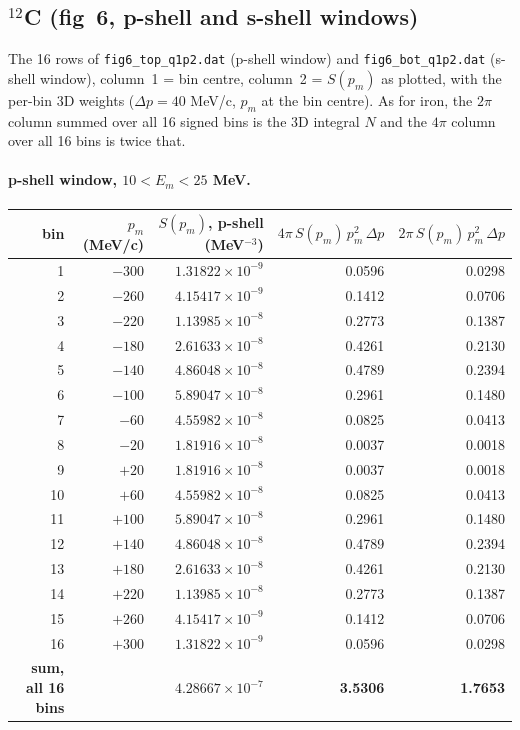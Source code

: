 \documentclass[11pt]{article}
\begin{document}
\subsection{\texorpdfstring{$^{12}$C}{C12} (fig~6, p-shell and s-shell windows)}

The 16 rows of \texttt{fig6\_top\_q1p2.dat} (p-shell window) and
\texttt{fig6\_bot\_q1p2.dat} (s-shell window), column~1 = bin centre, column~2 =
$S(p_m)$ as plotted, with the per-bin 3D weights ($\Delta p = 40$ MeV/c, $p_m$
at the bin centre). As for iron, the $2\pi$ column summed over all 16 signed
bins is the 3D integral $N$ and the $4\pi$ column over all 16 bins is twice
that.

\paragraph{p-shell window, $10 < E_m < 25$ MeV.}
\begin{center}\small\renewcommand{\arraystretch}{0.95}
\begin{tabular}{rrrrr}
\toprule
bin & $p_m$ (MeV/c) & $S(p_m)$, p-shell (MeV$^{-3}$) & $4\pi\,S(p_m)\,p_m^2\,\Delta p$ & $2\pi\,S(p_m)\,p_m^2\,\Delta p$ \\
\midrule
1 & $-300$ & $1.31822\times10^{-9}$ & 0.0596 & 0.0298 \\
2 & $-260$ & $4.15417\times10^{-9}$ & 0.1412 & 0.0706 \\
3 & $-220$ & $1.13985\times10^{-8}$ & 0.2773 & 0.1387 \\
4 & $-180$ & $2.61633\times10^{-8}$ & 0.4261 & 0.2130 \\
5 & $-140$ & $4.86048\times10^{-8}$ & 0.4789 & 0.2394 \\
6 & $-100$ & $5.89047\times10^{-8}$ & 0.2961 & 0.1480 \\
7 & $-60$ & $4.55982\times10^{-8}$ & 0.0825 & 0.0413 \\
8 & $-20$ & $1.81916\times10^{-8}$ & 0.0037 & 0.0018 \\
9 & $+20$ & $1.81916\times10^{-8}$ & 0.0037 & 0.0018 \\
10 & $+60$ & $4.55982\times10^{-8}$ & 0.0825 & 0.0413 \\
11 & $+100$ & $5.89047\times10^{-8}$ & 0.2961 & 0.1480 \\
12 & $+140$ & $4.86048\times10^{-8}$ & 0.4789 & 0.2394 \\
13 & $+180$ & $2.61633\times10^{-8}$ & 0.4261 & 0.2130 \\
14 & $+220$ & $1.13985\times10^{-8}$ & 0.2773 & 0.1387 \\
15 & $+260$ & $4.15417\times10^{-9}$ & 0.1412 & 0.0706 \\
16 & $+300$ & $1.31822\times10^{-9}$ & 0.0596 & 0.0298 \\
\midrule
\textbf{sum, all 16 bins} & & \textbf{$4.28667\times10^{-7}$} & \textbf{3.5306} & \textbf{1.7653} \\
\bottomrule
\end{tabular}
\end{center}
\end{document}
